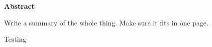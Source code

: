 \newpage
{\Huge \bf Abstract}
\vspace{24pt} 


Write a summary of the whole thing. Make 
sure it fits in one page. 

Testing

\newpage
\vspace*{\fill}
